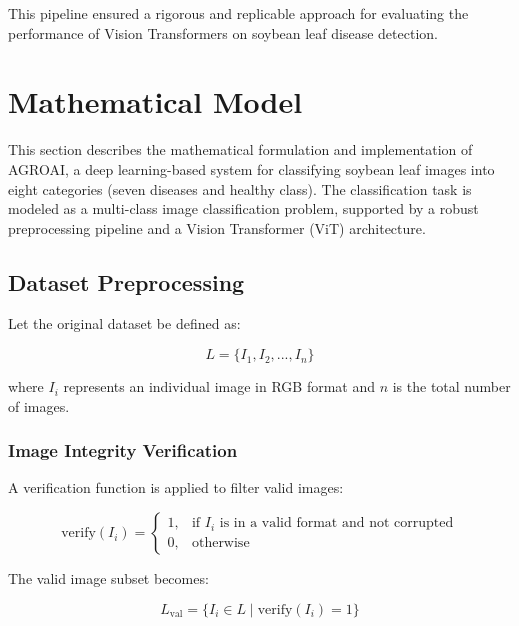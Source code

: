 \documentclass[preprint,12pt]{elsarticle}
\begin{document}
This pipeline ensured a rigorous and replicable approach for evaluating the performance of Vision Transformers on soybean leaf disease detection.

\section{Mathematical Model}

This section describes the mathematical formulation and implementation of AGROAI, a deep learning-based system for classifying soybean leaf images into eight categories (seven diseases and healthy class). The classification task is modeled as a multi-class image classification problem, supported by a robust preprocessing pipeline and a Vision Transformer (ViT) architecture.

\subsection{Dataset Preprocessing}

Let the original dataset be defined as:

\begin{equation}
L = \{I_1, I_2, ..., I_n\}
\label{eq:dataset-definition}
\end{equation}

where \( I_i \) represents an individual image in RGB format and \( n \) is the total number of images.

\subsubsection{Image Integrity Verification}

A verification function is applied to filter valid images:

\begin{equation}
\text{verify}(I_i) =
\begin{cases}
1, & \text{if } I_i \text{ is in a valid format and not corrupted} \\
0, & \text{otherwise}
\end{cases}
\label{eq:image-verification}
\end{equation}

The valid image subset becomes:

\begin{equation}
L_{\text{val}} = \{ I_i \in L \mid \text{verify}(I_i) = 1 \}
\label{eq:valid-images}
\end{equation}
\end{document}

